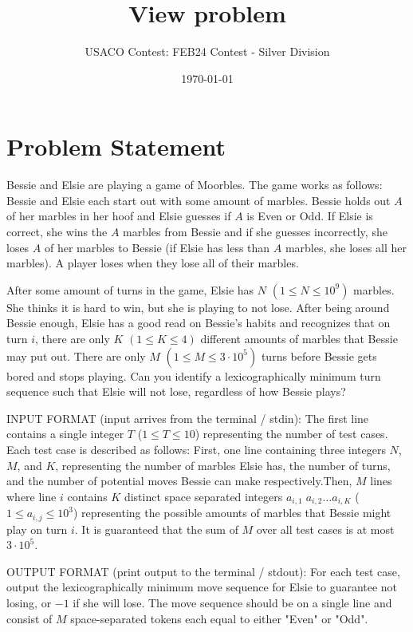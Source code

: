 \documentclass[12pt]{article}
\title{View problem}
\author{USACO Contest: FEB24 Contest - Silver Division}
\date{\today}
\begin{document}
\maketitle

\section*{Problem Statement}


Bessie and Elsie are playing a game of Moorbles. The game works as follows:
Bessie and Elsie each start out with some amount of marbles. Bessie holds out
$A$ of her marbles in her hoof and Elsie guesses if $A$ is Even or Odd. If Elsie
is correct, she wins the $A$ marbles from Bessie and if she guesses incorrectly,
she loses $A$ of her marbles to Bessie (if Elsie has less than $A$ marbles, she
loses all her marbles). A player loses when they lose all of their marbles.

After some amount of turns in the game, Elsie has $N$ $(1 \leq N \leq 10^9)$
marbles. She thinks it is hard to win, but she is playing to not lose. After
being around Bessie enough, Elsie has a good read on Bessie's habits and
recognizes that on turn $i$, there are only $K$ $(1 \leq K \leq 4)$ different
amounts of marbles that Bessie may put out. There are only $M$
$(1 \leq M \leq 3 \cdot 10^5)$ turns before Bessie gets bored and stops playing.
Can you identify a lexicographically minimum turn sequence such that Elsie will
not lose, regardless of how Bessie plays?

INPUT FORMAT (input arrives from the terminal / stdin):
The first line contains a single integer $T$ ($1 \leq T \leq 10$) representing
the number of test cases. Each test case is described as follows:
 First, one line containing three integers $N$, $M$, and $K$, representing
the number of marbles Elsie has, the number of turns, and the number of
potential moves Bessie can make respectively.Then, $M$ lines where
line $i$ contains $K$ distinct space separated integers
$a_{i,1} \; a_{i,2} \ldots a_{i,K}$ ($1 \leq a_{i, j} \leq 10^3$) representing
the possible amounts of marbles that Bessie might play on turn $i$.
It is guaranteed that the sum of $M$ over all test cases is at most
$3 \cdot 10^5$.

OUTPUT FORMAT (print output to the terminal / stdout):
For each test case, output the lexicographically minimum move sequence for Elsie
to guarantee not losing, or $-1$ if she will lose. The move sequence should be
on a single line and consist of $M$ space-separated tokens each equal to either
"Even" or "Odd".
\end{document}
